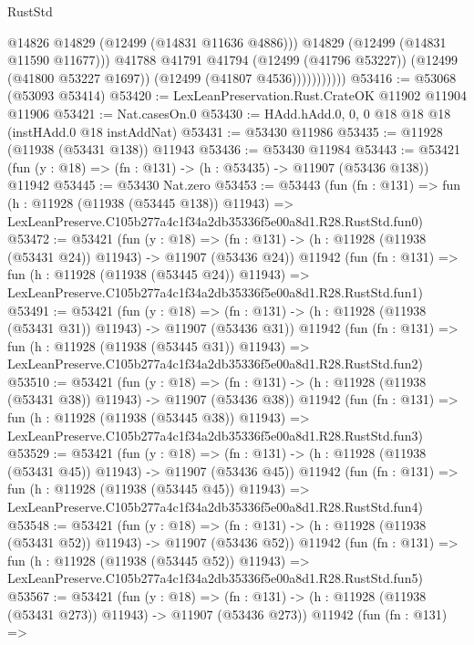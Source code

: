 \begin{lexlean}{RustStd}
\begin{coremodule}
                          @14826
                          @14829
                          (@12499 (@14831 @11636 @4886)))
                        @14829
                        (@12499 (@14831 @11590 @11677)))
                      @41788
                      @41791
                      @41794
                      (@12499 (@41796 @53227))
                      (@12499 (@41800 @53227 @1697))
                      (@12499 (@41807 @4536)))))))))))
@53416 := @53068 (@53093 @53414)
@53420 := LexLeanPreservation.Rust.CrateOK @11902 @11904 @11906
@53421 := Nat.casesOn.{0}
@53430 := HAdd.hAdd.{0, 0, 0} @18 @18 @18 (instHAdd.{0} @18 instAddNat)
@53431 := @53430 @11986
@53435 := @11928 (@11938 (@53431 @138)) @11943
@53436 := @53430 @11984
@53443 := @53421 (fun (y : @18) => (fn : @131) -> (h : @53435) -> @11907 (@53436 @138)) @11942
@53445 := @53430 Nat.zero
@53453 := @53443
    (fun (fn : @131) =>
    fun (h : @11928 (@11938 (@53445 @138)) @11943) =>
    LexLeanPreserve.C105b277a4c1f34a2db35336f5e00a8d1.R28.RustStd.fun0)
@53472 := @53421
    (fun (y : @18) =>
    (fn : @131) -> (h : @11928 (@11938 (@53431 @24)) @11943) -> @11907 (@53436 @24))
    @11942
    (fun (fn : @131) =>
    fun (h : @11928 (@11938 (@53445 @24)) @11943) =>
    LexLeanPreserve.C105b277a4c1f34a2db35336f5e00a8d1.R28.RustStd.fun1)
@53491 := @53421
    (fun (y : @18) =>
    (fn : @131) -> (h : @11928 (@11938 (@53431 @31)) @11943) -> @11907 (@53436 @31))
    @11942
    (fun (fn : @131) =>
    fun (h : @11928 (@11938 (@53445 @31)) @11943) =>
    LexLeanPreserve.C105b277a4c1f34a2db35336f5e00a8d1.R28.RustStd.fun2)
@53510 := @53421
    (fun (y : @18) =>
    (fn : @131) -> (h : @11928 (@11938 (@53431 @38)) @11943) -> @11907 (@53436 @38))
    @11942
    (fun (fn : @131) =>
    fun (h : @11928 (@11938 (@53445 @38)) @11943) =>
    LexLeanPreserve.C105b277a4c1f34a2db35336f5e00a8d1.R28.RustStd.fun3)
@53529 := @53421
    (fun (y : @18) =>
    (fn : @131) -> (h : @11928 (@11938 (@53431 @45)) @11943) -> @11907 (@53436 @45))
    @11942
    (fun (fn : @131) =>
    fun (h : @11928 (@11938 (@53445 @45)) @11943) =>
    LexLeanPreserve.C105b277a4c1f34a2db35336f5e00a8d1.R28.RustStd.fun4)
@53548 := @53421
    (fun (y : @18) =>
    (fn : @131) -> (h : @11928 (@11938 (@53431 @52)) @11943) -> @11907 (@53436 @52))
    @11942
    (fun (fn : @131) =>
    fun (h : @11928 (@11938 (@53445 @52)) @11943) =>
    LexLeanPreserve.C105b277a4c1f34a2db35336f5e00a8d1.R28.RustStd.fun5)
@53567 := @53421
    (fun (y : @18) =>
    (fn : @131) -> (h : @11928 (@11938 (@53431 @273)) @11943) -> @11907 (@53436 @273))
    @11942
    (fun (fn : @131) =>

\end{coremodule}
\end{lexlean}
